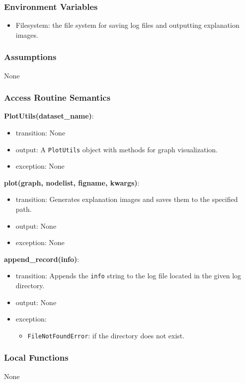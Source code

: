 \documentclass[12pt, titlepage]{article}
\begin{document}
\subsubsection{Environment Variables}
\begin{itemize}
  \item Filesystem: the file system for saving log files and outputting explanation images.
\end{itemize}

\subsubsection{Assumptions}
None

\subsubsection{Access Routine Semantics}

\noindent \textbf{PlotUtils(dataset\_name)}:
\begin{itemize}
  \item transition: None
  \item output: A \texttt{PlotUtils} object with methods for graph visualization.
  \item exception: None
\end{itemize}


\noindent \textbf{plot(graph, nodelist, figname, kwargs)}:
\begin{itemize}
  \item transition: Generates explanation images and saves them to the specified path.
  \item output: None
  \item exception: None
\end{itemize}


\noindent \textbf{append\_record(info)}:
\begin{itemize}
  \item transition: Appends the \texttt{info} string to the log file located in the given log directory.
  \item output: None
  \item exception: 
  \begin{itemize}
    \item \texttt{FileNotFoundError}: if the directory does not exist.
  \end{itemize}
\end{itemize}



\subsubsection{Local Functions}
None
\end{document}
